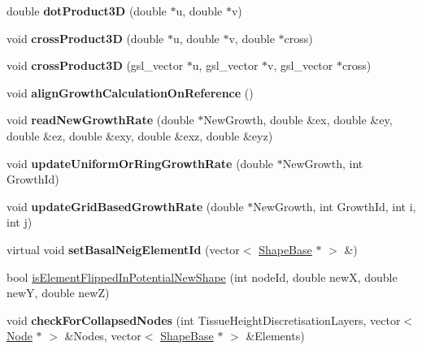 \begin{DoxyCompactItemize}
\item 
\hypertarget{classShapeBase_a6b58642f88a23bd984d7af48cbd4f95a}{}double {\bfseries dot\+Product3\+D} (double $\ast$u, double $\ast$v)\label{classShapeBase_a6b58642f88a23bd984d7af48cbd4f95a}

\item 
\hypertarget{classShapeBase_ab5c4c774227af1d446f80c0ef58044c9}{}void {\bfseries cross\+Product3\+D} (double $\ast$u, double $\ast$v, double $\ast$cross)\label{classShapeBase_ab5c4c774227af1d446f80c0ef58044c9}

\item 
\hypertarget{classShapeBase_a334a6cec6a698ac49006d8216a93ced9}{}void {\bfseries cross\+Product3\+D} (gsl\+\_\+vector $\ast$u, gsl\+\_\+vector $\ast$v, gsl\+\_\+vector $\ast$cross)\label{classShapeBase_a334a6cec6a698ac49006d8216a93ced9}

\item 
\hypertarget{classShapeBase_a9a980e69b3ccad29e21499921d575829}{}void {\bfseries align\+Growth\+Calculation\+On\+Reference} ()\label{classShapeBase_a9a980e69b3ccad29e21499921d575829}

\item 
\hypertarget{classShapeBase_a8f1565bbfd6c6a1452d95d910b4f7d9e}{}void {\bfseries read\+New\+Growth\+Rate} (double $\ast$New\+Growth, double \&ex, double \&ey, double \&ez, double \&exy, double \&exz, double \&eyz)\label{classShapeBase_a8f1565bbfd6c6a1452d95d910b4f7d9e}

\item 
\hypertarget{classShapeBase_a62f7b57ae77a98a009ba2c5cd520fa71}{}void {\bfseries update\+Uniform\+Or\+Ring\+Growth\+Rate} (double $\ast$New\+Growth, int Growth\+Id)\label{classShapeBase_a62f7b57ae77a98a009ba2c5cd520fa71}

\item 
\hypertarget{classShapeBase_aff32f6cd08aba5c167297852b72e40b0}{}void {\bfseries update\+Grid\+Based\+Growth\+Rate} (double $\ast$New\+Growth, int Growth\+Id, int i, int j)\label{classShapeBase_aff32f6cd08aba5c167297852b72e40b0}

\item 
\hypertarget{classShapeBase_a67ab37424a6fef45abab394b74bca134}{}virtual void {\bfseries set\+Basal\+Neig\+Element\+Id} (vector$<$ \hyperlink{classShapeBase}{Shape\+Base} $\ast$ $>$ \&)\label{classShapeBase_a67ab37424a6fef45abab394b74bca134}

\item 
bool \hyperlink{classShapeBase_a8763ab46f90adb819ec776a5829573c5}{is\+Element\+Flipped\+In\+Potential\+New\+Shape} (int node\+Id, double new\+X, double new\+Y, double new\+Z)
\item 
\hypertarget{classShapeBase_a966b9275bb7d1cc73f5253a3087436fb}{}void {\bfseries check\+For\+Collapsed\+Nodes} (int Tissue\+Height\+Discretisation\+Layers, vector$<$ \hyperlink{classNode}{Node} $\ast$ $>$ \&Nodes, vector$<$ \hyperlink{classShapeBase}{Shape\+Base} $\ast$ $>$ \&Elements)\label{classShapeBase_a966b9275bb7d1cc73f5253a3087436fb}


\end{DoxyCompactItemize}
